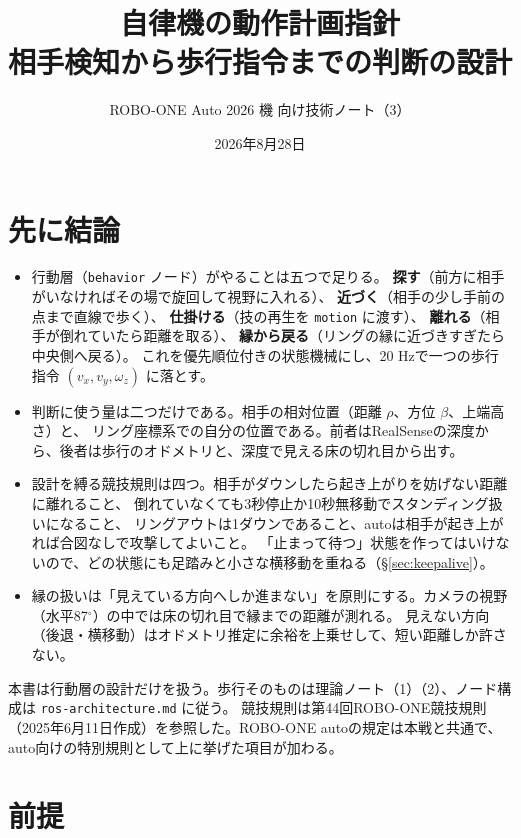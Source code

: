 \documentclass[a4paper,11pt]{ltjsarticle}
\title{自律機の動作計画指針\\
\large 相手検知から歩行指令までの判断の設計}
\author{ROBO-ONE Auto 2026 機 向け技術ノート（3）}
\date{2026年8月28日}
\newcommand{\code}[1]{\texttt{#1}}
\begin{document}
\maketitle

\section*{先に結論}

\begin{itemize}
\item 行動層（\code{behavior} ノード）がやることは五つで足りる。
\textbf{探す}（前方に相手がいなければその場で旋回して視野に入れる）、
\textbf{近づく}（相手の少し手前の点まで直線で歩く）、
\textbf{仕掛ける}（技の再生を \code{motion} に渡す）、
\textbf{離れる}（相手が倒れていたら距離を取る）、
\textbf{縁から戻る}（リングの縁に近づきすぎたら中央側へ戻る）。
これを優先順位付きの状態機械にし、20 Hzで一つの歩行指令 $(v_x,v_y,\omega_z)$ に落とす。
\item 判断に使う量は二つだけである。相手の相対位置（距離 $\rho$、方位 $\beta$、上端高さ）と、
リング座標系での自分の位置である。前者はRealSenseの深度から、後者は歩行のオドメトリと、深度で見える床の切れ目から出す。
\item 設計を縛る競技規則は四つ。相手がダウンしたら起き上がりを妨げない距離に離れること、
倒れていなくても3秒停止か10秒無移動でスタンディング扱いになること、
リングアウトは1ダウンであること、autoは相手が起き上がれば合図なしで攻撃してよいこと。
「止まって待つ」状態を作ってはいけないので、どの状態にも足踏みと小さな横移動を重ねる（\S\ref{sec:keepalive}）。
\item 縁の扱いは「見えている方向へしか進まない」を原則にする。カメラの視野（水平87$^\circ$）の中では床の切れ目で縁までの距離が測れる。
見えない方向（後退・横移動）はオドメトリ推定に余裕を上乗せして、短い距離しか許さない。
\end{itemize}

本書は行動層の設計だけを扱う。歩行そのものは理論ノート（1）（2）、ノード構成は \code{ros-architecture.md} に従う。
競技規則は第44回ROBO-ONE競技規則（2025年6月11日作成）を参照した。ROBO-ONE autoの規定は本戦と共通で、
auto向けの特別規則として上に挙げた項目が加わる。

\clearpage
{\small\tableofcontents}
\clearpage

\section{前提}\label{sec:premise}
\end{document}
